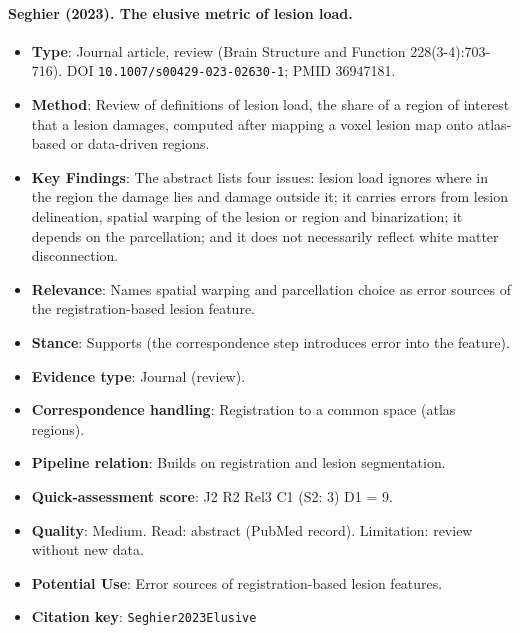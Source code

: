 \documentclass[journal,onecolumn]{IEEEtran}
\begin{document}
\paragraph{Seghier (2023). The elusive metric of lesion load.~\cite{Seghier2023Elusive}}\mbox{}

\begin{itemize}

\item{} \textbf{Type}: Journal article, review (Brain Structure and Function 228(3-4):703-716). DOI \nolinkurl{10.1007/s00429-023-02630-1}; PMID 36947181.

\item{} \textbf{Method}: Review of definitions of lesion load, the share of a region of interest that a lesion damages, computed after mapping a voxel lesion map onto atlas-based or data-driven regions.

\item{} \textbf{Key Findings}: The abstract lists four issues: lesion load ignores where in the region the damage lies and damage outside it; it carries errors from lesion delineation, spatial warping of the lesion or region and binarization; it depends on the parcellation; and it does not necessarily reflect white matter disconnection.

\item{} \textbf{Relevance}: Names spatial warping and parcellation choice as error sources of the registration-based lesion feature.

\item{} \textbf{Stance}: Supports (the correspondence step introduces error into the feature).

\item{} \textbf{Evidence type}: Journal (review).

\item{} \textbf{Correspondence handling}: Registration to a common space (atlas regions).

\item{} \textbf{Pipeline relation}: Builds on registration and lesion segmentation.

\item{} \textbf{Quick-assessment score}: J2 R2 Rel3 C1 (S2: 3) D1 = 9.

\item{} \textbf{Quality}: Medium. Read: abstract (PubMed record). Limitation: review without new data.

\item{} \textbf{Potential Use}: Error sources of registration-based lesion features.

\item{} \textbf{Citation key}: \texttt{Seghier2023Elusive}

\end{itemize}
\end{document}
